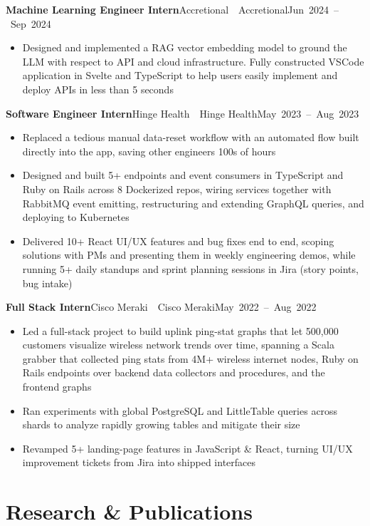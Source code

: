 \documentclass[letterpaper,11pt]{article}
\newcommand{\entry}[3]{%
  \needspace{4\baselineskip}%
  \textbf{#1}\ifx\relax#2\relax\else\ \textbar\ #2\fi\hfill\mbox{#3}\par}
\newenvironment{bullets}
  {\begin{itemize}[leftmargin=1.2em, label=\textbullet, itemsep=0.5pt, parsep=0pt, topsep=2pt]}
  {\end{itemize}\vspace{5pt}}
\begin{document}
\entry{Machine Learning Engineer Intern}{Accretional}{Jun 2024 -- Sep 2024}
\begin{bullets}
  \item Designed and implemented a RAG vector embedding model to ground the LLM with respect to API and cloud infrastructure. Fully constructed VSCode application in Svelte and TypeScript to help users easily implement and deploy APIs in less than 5 seconds
\end{bullets}

\entry{Software Engineer Intern}{Hinge Health}{May 2023 -- Aug 2023}
\begin{bullets}
  \item Replaced a tedious manual data-reset workflow with an automated flow built directly into the app, saving other engineers 100s of hours
  \item Designed and built 5+ endpoints and event consumers in TypeScript and Ruby on Rails across 8 Dockerized repos, wiring services together with RabbitMQ event emitting, restructuring and extending GraphQL queries, and deploying to Kubernetes
  \item Delivered 10+ React UI/UX features and bug fixes end to end, scoping solutions with PMs and presenting them in weekly engineering demos, while running 5+ daily standups and sprint planning sessions in Jira (story points, bug intake)
\end{bullets}

\entry{Full Stack Intern}{Cisco Meraki}{May 2022 -- Aug 2022}
\begin{bullets}
  \item Led a full-stack project to build uplink ping-stat graphs that let 500,000 customers visualize wireless network trends over time, spanning a Scala grabber that collected ping stats from 4M+ wireless internet nodes, Ruby on Rails endpoints over backend data collectors and procedures, and the frontend graphs
  \item Ran experiments with global PostgreSQL and LittleTable queries across shards to analyze rapidly growing tables and mitigate their size
  \item Revamped 5+ landing-page features in JavaScript \& React, turning UI/UX improvement tickets from Jira into shipped interfaces
\end{bullets}

\newpage
\section{Research \& Publications}
\end{document}
